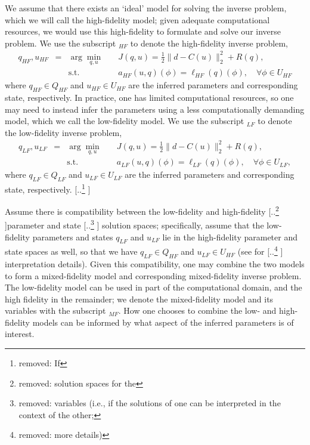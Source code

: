 \documentclass[review,sort&compress]{elsarticle}
\providecommand{\DIFaddtex}[1]{{\protect\color{blue} \sf #1}} %
\providecommand{\DIFdeltex}[1]{{\protect\color{red} [..\footnote{removed: #1} ]}} %
\providecommand{\DIFaddbegin}{} %
\providecommand{\DIFaddend}{} %
\providecommand{\DIFdelbegin}{} %
\providecommand{\DIFdelend}{} %
\providecommand{\DIFadd}[1]{\texorpdfstring{\DIFaddtex{#1}}{#1}} %
\providecommand{\DIFdel}[1]{\texorpdfstring{\DIFdeltex{#1}}{}} %
\newcommand{\DIFscaledelfig}{0.5}
\newlength{\DIFdelgraphicswidth} %
\newlength{\DIFdelgraphicsheight} %
\newcommand{\DIFaddincludegraphics}[2][]{{\color{blue}\fbox{\DIFOincludegraphics[#1]{#2}}}} %
\newcommand{\DIFdelincludegraphics}[2][]{%
\sbox{\DIFdelgraphicsbox}{\DIFOincludegraphics[#1]{#2}}%
\settoboxwidth{\DIFdelgraphicswidth}{\DIFdelgraphicsbox} %
\settoboxtotalheight{\DIFdelgraphicsheight}{\DIFdelgraphicsbox} %
\scalebox{\DIFscaledelfig}{%
\parbox[b]{\DIFdelgraphicswidth}{\usebox{\DIFdelgraphicsbox}\\[-\baselineskip] \rule{\DIFdelgraphicswidth}{0em}}\llap{\resizebox{\DIFdelgraphicswidth}{\DIFdelgraphicsheight}{%
\setlength{\unitlength}{\DIFdelgraphicswidth}%
\begin{picture}(1,1)%
\thicklines\linethickness{2pt} %
{\color[rgb]{1,0,0}\put(0,0){\framebox(1,1){}}}%
{\color[rgb]{1,0,0}\put(0,0){\line( 1,1){1}}}%
{\color[rgb]{1,0,0}\put(0,1){\line(1,-1){1}}}%
\end{picture}%
}\hspace*{3pt}}} %
} %
\DeclareRobustCommand{\DIFaddbegin}{\DIFOaddbegin \let\includegraphics\DIFaddincludegraphics} %
\DeclareRobustCommand{\DIFaddend}{\DIFOaddend \let\includegraphics\DIFOincludegraphics} %
\DeclareRobustCommand{\DIFdelbegin}{\DIFOdelbegin \let\includegraphics\DIFdelincludegraphics} %
\DeclareRobustCommand{\DIFdelend}{\DIFOaddend \let\includegraphics\DIFOincludegraphics} %
\begin{document}
We assume that there exists an `ideal' model for solving the inverse problem, which we will call the high-fidelity model; given adequate computational resources, we would use this high-fidelity to formulate and solve our inverse problem. We use the subscript $_{HF}$ to denote the high-fidelity inverse problem,
%
\begin{subequations}
\label{eq:invOptHF}
\begin{align}
q_{HF},u_{HF} &=&\arg\min\limits_{q,u} & \quad J(q,u)=\frac{1}{2}\|d-C(u)\|_2^2 + R(q), \label{eq:invOpt_objHF} \\
&&\textrm{s.t. }& \quad a_{HF}(u,q)(\phi)=\ell_{HF}(q)(\phi),\quad\forall\phi\in U_{HF} \label{eq:invOpt_consHF}
\end{align}
\end{subequations}
%
where $q_{HF} \in Q_{HF}$ and $u_{HF}\in U_{HF}$ are the inferred parameters and corresponding state, respectively. In practice, one has limited computational resources, so one may need to instead infer the parameters using a less computationally demanding model, which we call the low-fidelity model. We use the subscript $_{LF}$ to denote the low-fidelity inverse problem,
%
\begin{subequations}
\label{eq:invOptLF}
\begin{align}
q_{LF},u_{LF} &=& \arg\min\limits_{q,u} & \quad J(q,u)=\frac{1}{2}\|d-C(u)\|_2^2 + R(q), \label{eq:invOpt_objLF} \\
&& \textrm{s.t. }& \quad a_{LF}(u,q)(\phi)=\ell_{LF}(q)(\phi),\quad\forall\phi\in U_{LF}, \label{eq:invOpt_consLF}
\end{align}
\end{subequations}
%
where $q_{LF} \in Q_{LF}$ and $u_{LF}\in U_{LF}$ are the inferred parameters and corresponding state, respectively. 
\DIFdelbegin \DIFdel{If }\DIFdelend \DIFaddbegin 

\DIFadd{Assume }\DIFaddend there is compatibility between the low-fidelity and high-fidelity \DIFdelbegin \DIFdel{solution spaces for the }\DIFdelend parameter and state \DIFdelbegin \DIFdel{variables (i.e., if the solutions of one can be interpreted in the context of the other; }\DIFdelend \DIFaddbegin \DIFadd{solution spaces; specifically, assume that the low-fidelity parameters and states $q_{LF}$ and $u_{LF}$ lie in the high-fidelity parameter and state spaces as well, so that we have $q_{LF}\in Q_{HF}$ and $u_{LF}\in U_{HF}$ (}\DIFaddend see  for \DIFdelbegin \DIFdel{more details)}\DIFdelend \DIFaddbegin \DIFadd{interpretation details). Given this compatibility}\DIFaddend , one may combine the two models to form a mixed-fidelity model and corresponding mixed-fidelity inverse problem. The low-fidelity model can be used in part of the computational domain, and the high fidelity in the remainder; we denote the mixed-fidelity model and its variables with the subscript $_{MF}$. How one chooses to combine the low- and high-fidelity models can be informed by what aspect of the inferred parameters is of interest.
\end{document}
